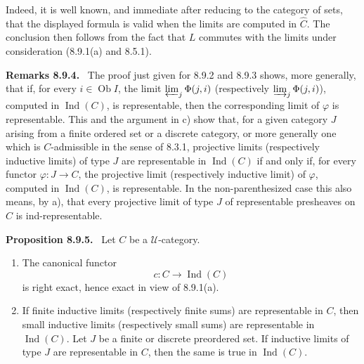 \documentclass[11pt]{article}
\newcommand{\U}{\mathcal{U}}
\newcommand{\Ob}{\operatorname{Ob}}
\newcommand{\Ind}{\operatorname{Ind}}
\newenvironment{statement}[1]{\par\medskip\noindent\textbf{#1.}\ }{\par\medskip}
\begin{document}
Indeed, it is well known, and immediate after reducing to the category of sets, that the displayed formula is valid when the limits are computed in $\widehat C$. The conclusion then follows from the fact that $L$ commutes with the limits under consideration (8.9.1(a) and 8.5.1).

\begin{statement}{Remarks 8.9.4}
The proof just given for 8.9.2 and 8.9.3 shows, more generally, that if, for every $i\in\Ob I$, the limit $\varprojlim_j\Phi(j,i)$ (respectively $\varinjlim_j\Phi(j,i)$), computed in $\Ind(C)$, is representable, then the corresponding limit of $\varphi$ is representable. This and the argument in c) show that, for a given category $J$ arising from a finite ordered set or a discrete category, or more generally one which is $C$-admissible in the sense of 8.3.1, projective limits (respectively inductive limits) of type $J$ are representable in $\Ind(C)$ if and only if, for every functor $\varphi:J\to C$, the projective limit (respectively inductive limit) of $\varphi$, computed in $\Ind(C)$, is representable. In the non-parenthesized case this also means, by a), that every projective limit of type $J$ of representable presheaves on $C$ is ind-representable.
\end{statement}

\begin{statement}{Proposition 8.9.5}
Let $C$ be a $\U$-category.
\begin{enumerate}[label=\alph*)]
\item The canonical functor
\[
 c:C\longrightarrow\Ind(C)
\]
is right exact, hence exact in view of 8.9.1(a).

\item If finite inductive limits (respectively finite sums) are representable in $C$, then small inductive limits (respectively small sums) are representable in $\Ind(C)$. Let $J$ be a finite or discrete preordered set. If inductive limits of type $J$ are representable in $C$, then the same is true in $\Ind(C)$.
\end{enumerate}
\end{statement}
\end{document}
